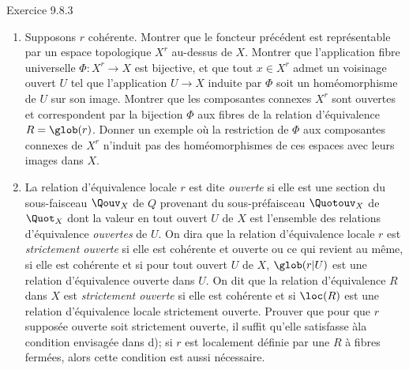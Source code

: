 \begin{enonce*}[remark]{Exercice 9.8.3}
\begin{enumerate}
\item Supposons $r$ cohérente. Montrer que le foncteur précédent est
représentable par un espace topologique $X^r$ au-dessus de $X$.
Montrer que l'application fibre universelle $\Phi:X^r\rightarrow X$
est bijective, et que tout $x\in X^r$ admet un voisinage ouvert $U$
tel que l'application $U\rightarrow X$ induite par $\Phi$ soit un
homéomorphisme de $U$ sur son image. Montrer que les composantes
connexes $X^r$ sont ouvertes et correspondent par la bijection
$\Phi$ aux fibres de la relation d'équivalence $R=\glob(r)$. Donner
un exemple où la restriction de $\Phi$ aux composantes connexes de
$X^r$ n'induit pas des homéomorphismes de ces espaces avec leurs
images dans $X$.

\item La relation d'équivalence locale $r$ est dite \emph{ouverte} si
elle est une section du sous-faisceau $\Qouv_X$ de $Q$ provenant du
sous-préfaisceau $\Quotouv_X$ de $\Quot_X$ dont la valeur en tout
ouvert $U$ de $X$ est l'ensemble des relations d'équivalence
\emph{ouvertes} de $U$. On dira que la relation d'équivalence locale
$r$ est \emph{strictement ouverte} si elle est cohérente et ouverte
ou ce qui revient au même, si elle est cohérente et si pour tout
ouvert $U$ de $X$, $\glob(r| U)$ est une relation d'équivalence
ouverte dans $U$. On dit que la relation d'équivalence $R$ dans $X$
est \emph{strictement ouverte} si elle est cohérente et si $\loc(R)$
est une relation d'équivalence locale strictement ouverte. Prouver
que pour que $r$ supposée ouverte soit strictement ouverte, il
suffit qu'elle satisfasse à\pageoriginale la condition envisagée
dans d); si $r$ est localement définie par une $R$ à fibres fermées,
alors cette condition est aussi nécessaire.


\end{enumerate}
\end{enonce*}
